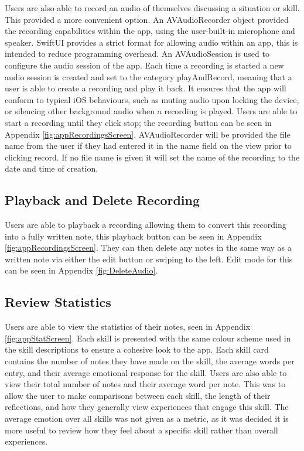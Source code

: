 \documentclass{l4proj}
\begin{document}
Users are also able to record an audio of themselves discussing a situation or skill. This provided a more convenient option. An AVAudioRecorder object provided the recording capabilities within the app, using the user-built-in microphone and speaker. SwiftUI provides a strict format for allowing audio within an app, this is intended to reduce programming overhead. An AVAudioSession is used to configure the audio session of the app. Each time a recording is started a new audio session is created and set to the category playAndRecord, meaning that a user is able to create a recording and play it back. It ensures that the app will conform to typical iOS behaviours, such as muting audio upon locking the device, or silencing other background audio when a recording is played. 
Users are able to start a recording until they click stop; the recording button can be seen in Appendix \ref{fig:appRecordingsScreen}. AVAudioRecorder will be provided the file name from the user if they had entered it in the name field on the view prior to clicking record. If no file name is given it will set the name of the recording to the date and time of creation.

\subsection{Playback and Delete Recording}

Users are able to playback a recording allowing them to convert this recording into a fully written note, this playback button can be seen in Appendix \ref{fig:appRecordingsScreen}. They can then delete any notes in the same way as a written note via either the edit button or swiping to the left. Edit mode for this can be seen in Appendix \ref{fig:DeleteAudio}.


\subsection{Review Statistics}

Users are able to view the statistics of their notes, seen in Appendix \ref{fig:appStatScreen}. Each skill is presented with the same colour scheme used in the skill descriptions to ensure a cohesive look to the app. Each skill card contains the number of notes they have made on the skill, the average words per entry, and their average emotional response for the skill. Users are also able to view their total number of notes and their average word per note. This was to allow the user to make comparisons between each skill, the length of their reflections, and how they generally view experiences that engage this skill. The average emotion over all skills was not given as a metric, as it was decided it is more useful to review how they feel about a specific skill rather than overall experiences.
\end{document}
